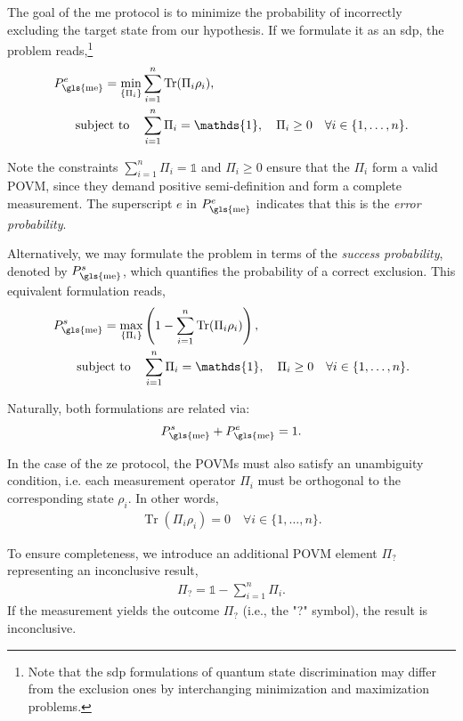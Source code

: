 \documentclass[12pt,letterpaper]{article}
\DeclareMathOperator{\tr}{Tr}
\begin{document}
\begin{multicols}{2}
The goal of the \gls{me} protocol is to minimize the probability of incorrectly excluding the target state from our hypothesis. If we formulate it as an \gls{sdp}, the problem reads,\footnote{Note that the \gls{sdp} formulations of quantum state discrimination may differ from the exclusion ones by interchanging minimization and maximization problems.}
\begin{align*}
	P_{\text{\gls{me}}}^e = \min_{\left\{\Pi_i\right\}} &\sum_{i=1}^n \tr(\Pi_i \rho_i),\\
	\text{subject to} \quad & \sum_{i=1}^n \Pi_i = \mathds{1}, \quad \Pi_i \geq 0 \quad \forall i \in \{1, \dots, n\}.
\end{align*}

Note the constraints $\sum_{i=1}^n \Pi_i = \mathds{1}$ and $\Pi_i \geq 0$ ensure that the $\Pi_i$ form a valid POVM, since they demand positive semi-definition and form a complete measurement. The superscript $e$ in $P_{\text{\gls{me}}}^e$ indicates that this is the \emph{error probability}.

Alternatively, we may formulate the problem in terms of the \emph{success probability}, denoted by $P_{\text{\gls{me}}}^s$, which quantifies the probability of a correct exclusion. This equivalent formulation reads,
\begin{align*}
	P_{\text{\gls{me}}}^s = \max_{\left\{\Pi_i\right\}} &\left(1 - \sum_{i=1}^n \tr(\Pi_i \rho_i)\right),\\
	\text{subject to} \quad & \sum_{i=1}^n \Pi_i = \mathds{1}, \quad \Pi_i \geq 0 \quad \forall i \in \{1, \dots, n\}.
\end{align*}

Naturally, both formulations are related via:
\begin{align*}
P_{\text{\gls{me}}}^s + P_{\text{\gls{me}}}^e = 1.
\end{align*}

In the case of the \gls{ze} protocol, the POVMs must also satisfy an unambiguity condition, i.e. each measurement operator $\Pi_i$ must be orthogonal to the corresponding state $\rho_i$. In other words,
\begin{align*}
\tr(\Pi_i \rho_i) = 0 \quad \forall i \in \{1, \dots, n\}.
\end{align*}

To ensure completeness, we introduce an additional POVM element $\Pi_?$ representing an inconclusive result,
\begin{align*}
\Pi_? = \mathds{1} - \sum_{i=1}^n \Pi_i.
\end{align*}
If the measurement yields the outcome $\Pi_?$ (i.e., the "?" symbol), the result is inconclusive.


\end{multicols}
\end{document}
